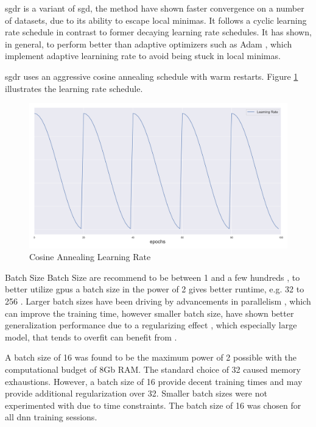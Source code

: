 \begin{enumdescript}
\begin{enumdescript}
		\gls{sgdr} \cite{loshchilov_sgdr:_2016} is a variant of \gls{sgd}, the method have shown faster convergence on a number of datasets, due to its ability to escape local minimas. It follows a cyclic learning rate schedule in contrast to former decaying learning rate schedules. It has shown, in general, to perform better than adaptive optimizers such as Adam \cite{kingma_adam:_2014}, which implement adaptive learnining rate to avoid being stuck in local minimas. 
		
		\gls{sgdr} uses an aggressive cosine annealing schedule with warm restarts. Figure \ref{fig:cosineannealing} illustrates the learning rate schedule.
		
		\begin{figure}
			\centering
			\includegraphics[width=.7\linewidth]{figures/lr.png}
			\caption[Cosine Annealing Learning Rate]{Cosine Annealing Learning Rate} \label{fig:cosineannealing}
		\end{figure}
		
		\item[Batch Size] Batch Size are recommend to be between 1 and a few hundreds \cite{bengio_practical_2012}, to better utilize \gls{gpu}s a batch size in the power of 2 gives better runtime, e.g. 32 to 256 \cite{goodfellow_deep_2016}. Larger batch sizes have been driving by advancements in parallelism \cite{dean_large_2012}, which can improve the training time, however smaller batch size, have shown better generalization performance due to a regularizing effect \cite{masters_revisiting_nodate}, which especially large model, that tends to overfit can benefit from \cite{goodfellow_deep_2016}. 
		
		A batch size of 16 was found to be the maximum power of 2 possible with the computational budget of 8Gb RAM. The standard choice of 32 caused memory exhaustions. However, a batch size of 16 provide decent training times and may provide additional regularization over 32. Smaller batch sizes were not experimented with due to time constraints. The batch size of 16 was chosen for all \gls{dnn} training sessions.
		

\end{enumdescript}
\end{enumdescript}
